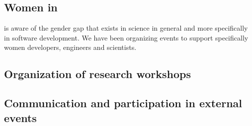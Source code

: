 \documentclass{deliverablereport}
\begin{document}


\subsection{Women in \ODK}

\ODK is aware of the gender gap that exists in science in general
and more specifically in software development. We have been organizing
events to support specifically women developers, engineers and scientists.



\subsection{Organization of research workshops}



\subsection{Communication and participation in external events}













\end{document}
